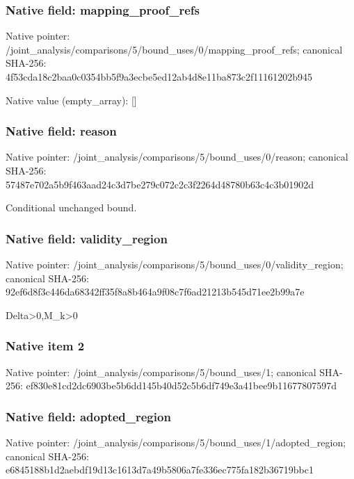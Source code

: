 \documentclass[10pt,a4paper]{article}
\begin{document}
\subsubsection{Native field: mapping\_\allowbreak{}proof\_\allowbreak{}refs}
Native pointer: /joint\_\allowbreak{}analysis/comparisons/5/bound\_\allowbreak{}uses/0/mapping\_\allowbreak{}proof\_\allowbreak{}refs; canonical SHA-256: 4f53cda18c2baa0c0354bb5f9a3ecbe5ed12ab4d8e11ba873c2f11161202b945

Native value (empty\_\allowbreak{}array): []

\subsubsection{Native field: reason}
Native pointer: /joint\_\allowbreak{}analysis/comparisons/5/bound\_\allowbreak{}uses/0/reason; canonical SHA-256: 57487e702a5b9f463aad24c3d7be279c072c2c3f2264d48780b63c4c3b01902d

\begingroup\raggedright\sloppy Conditional unchanged bound.\par\endgroup

\subsubsection{Native field: validity\_\allowbreak{}region}
Native pointer: /joint\_\allowbreak{}analysis/comparisons/5/bound\_\allowbreak{}uses/0/validity\_\allowbreak{}region; canonical SHA-256: 92ef6d8f3c446da68342ff35f8a8b464a9f08c7f6ad21213b545d71ee2b99a7e

\begingroup\raggedright\sloppy Delta>0,\allowbreak{}M\_\allowbreak{}k>0\par\endgroup

\subsubsection{Native item 2}
Native pointer: /joint\_\allowbreak{}analysis/comparisons/5/bound\_\allowbreak{}uses/1; canonical SHA-256: ef830e81cd2dc6903be5b6dd145b40d52c5b6df749e3a41bee9b11677807597d

\subsubsection{Native field: adopted\_\allowbreak{}region}
Native pointer: /joint\_\allowbreak{}analysis/comparisons/5/bound\_\allowbreak{}uses/1/adopted\_\allowbreak{}region; canonical SHA-256: e6845188b1d2aebdf19d13c1613d7a49b5806a7fe336ec775fa182b36719bbc1
\end{document}
